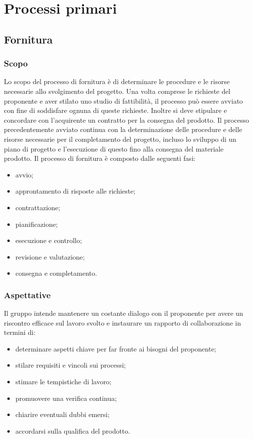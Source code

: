 \section{Processi primari}
\subsection{Fornitura}
\subsubsection{Scopo}
Lo scopo del processo di fornitura è di determinare le procedure e le risorse necessarie allo svolgimento del progetto. Una volta comprese le richieste del proponente e aver stilato uno studio di fattibilità, il processo può essere avviato con fine di soddisfare ognuna di queste richieste. Inoltre si deve stipulare e concordare con l'acquirente un contratto per la consegna del prodotto.
Il processo precedentemente avviato continua con la determinazione delle procedure e delle risorse necessarie per il completamento del progetto, incluso lo sviluppo di un piano di progetto e l'esecuzione di questo fino alla consegna del materiale prodotto.
	Il processo di fornitura è composto dalle seguenti fasi:
	\begin{itemize}
		\item avvio;
		\item approntamento di risposte alle richieste;
		\item contrattazione;
		\item pianificazione;
		\item esecuzione e controllo;
		\item revisione e valutazione;
		\item consegna e completamento.
	\end{itemize}
	\subsubsection{Aspettative}
	Il gruppo intende mantenere un costante dialogo con il proponente per avere un riscontro efficace sul lavoro svolto e instaurare un rapporto di collaborazione in termini di:
	\begin{itemize}
		\item determinare aspetti chiave per far fronte ai bisogni del proponente;
		\item stilare requisiti e vincoli sui processi;
		\item stimare le tempistiche di lavoro;
		\item promuovere una verifica continua;
		\item chiarire eventuali dubbi emersi;
		\item accordarsi sulla qualifica del prodotto.
	\end{itemize}
